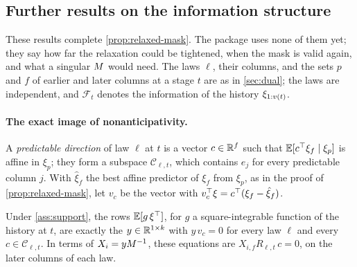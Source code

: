 \subsection{Further results on the information structure}
\label{app:information}

These results complete \cref{prop:relaxed-mask}.
The package uses none of them yet; they say how far the relaxation could be tightened, when the mask is valid again, and what a singular $M$ would need.
The laws $\ell$, their columns, and the sets $p$ and $f$ of earlier and later columns at a stage $t$ are as in \cref{sec:dual};
the laws are independent, and $\mathcal F_t$ denotes the information of the history $\xi_{1:v(t)}$.

\paragraph{The exact image of nonanticipativity.}
A \emph{predictable direction} of law $\ell$ at $t$ is a vector $c \in \mathbb{R}^f$ such that $\mathbb{E}[c^\top\xi_f \mid \xi_p]$ is affine in $\xi_p$;
they form a subspace $\mathcal C_{\ell,t}$, which contains $e_j$ for every predictable column $j$.
With $\hat\xi_f$ the best affine predictor of $\xi_f$ from $\xi_p$, as in the proof of \cref{prop:relaxed-mask}, let $v_c$ be the vector with $v_c^\top\xi = c^\top(\xi_f - \hat\xi_f)$.

\begin{proposition}
\label{prop:exact-image}
Under \cref{ass:support}, the rows $\mathbb{E}[g\,\xi^\top]$, for $g$ a square-integrable function of the history at $t$, are exactly the $y \in \mathbb{R}^{1\times k}$ with $y\,v_c = 0$ for every law $\ell$ and every $c \in \mathcal C_{\ell,t}$.
In terms of $X_i = yM^{-1}$, these equations are $X_{i,f}R_{\ell,t}\,c = 0$, on the later columns of each law.
\end{proposition}

